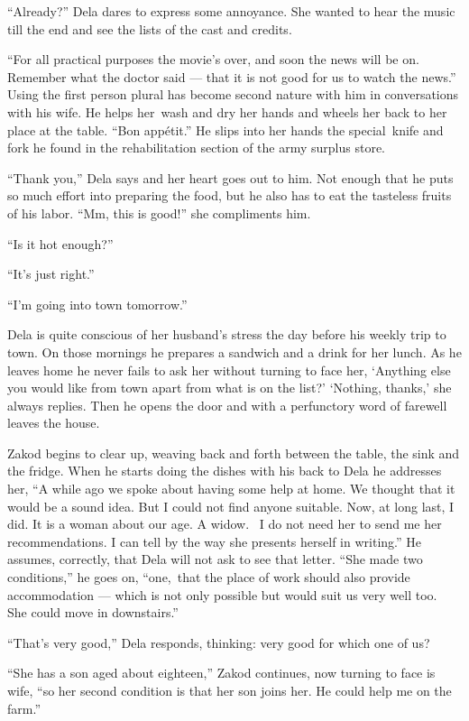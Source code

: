 \documentclass[twoside,11pt,openany]{book}
\begin{document}
``Already?'' Dela dares to express some annoyance. She wanted to hear the music till the end
and see the lists of the cast and credits.

``For all practical purposes the movie's over, and soon the news will be on. Remember what the doctor said
--- that it is not good for us to watch the news.'' Using the first person plural has become second nature
with him in conversations with his wife. He helps her~wash and dry her hands and wheels her back to her place at the
table. ``Bon app\'etit.'' He slips into her hands the special~knife and fork he found in the
rehabilitation section of the army surplus store.

``Thank you,'' Dela says and her heart goes out to him. Not enough that he puts so much effort
into preparing the food, but he also has to eat the tasteless fruits of his labor. ``Mm, this is good!''
she compliments him.

``Is it hot enough?''

``It's just right.''

``I'm going into town tomorrow.''

Dela is quite conscious of her husband's stress the day before his weekly trip to town. On those mornings he prepares a
sandwich and a drink for her lunch. As he leaves home he never fails to ask her without turning to face her, `Anything
else you would like from town apart from what is on the list?'  `Nothing, thanks,' she always replies. Then he
opens the door and with a perfunctory word of farewell leaves the house.

Zakod begins to clear up, weaving back and forth between the table, the sink and the fridge. When he starts doing the
dishes with his back to Dela he addresses her, ``A while ago we spoke about having some help at home. We
thought that it would be a sound idea. But I could not find anyone suitable. Now, at long last, I did. It is a woman
about our age. A widow.~ I do not need her to send me her recommendations. I can tell by the way she presents herself
in writing.''  He assumes, correctly, that Dela will not ask to see that letter.  ``She
made two conditions,'' he goes on, ``one,~that the place of work should also provide accommodation --- which
is not only possible but would suit us very well too.~ She could move in downstairs.''

``That's very good,'' Dela responds, thinking: very good for which one of us?

``She has a son aged about eighteen,'' Zakod continues, now turning to face is wife,
``so her second condition is that her son joins her. He could help me on the farm.''
\end{document}
